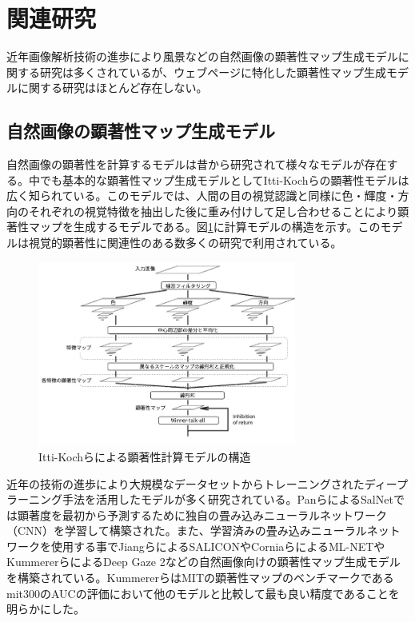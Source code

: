 \newpage
\renewcommand{\baselinestretch}{1.5}
\section{関連研究}
\renewcommand{\baselinestretch}{1}
\par 近年画像解析技術の進歩により風景などの自然画像の顕著性マップ生成モデルに関する研究は多くされているが、ウェブページに特化した顕著性マップ生成モデルに関する研究はほとんど存在しない。

\subsection{自然画像の顕著性マップ生成モデル}\label{subsec:related-01}
\par 自然画像の顕著性を計算するモデルは昔から研究されて様々なモデルが存在する。中でも基本的な顕著性マップ生成モデルとしてItti-Kochらの顕著性モデル\cite{itti1998model}は広く知られている。このモデルでは、人間の目の視覚認識と同様に色・輝度・方向のそれぞれの視覚特徴を抽出した後に重み付けして足し合わせることにより顕著性マップを生成するモデルである。図\ref{fig_itti-kochi}に計算モデルの構造を示す。このモデルは視覚的顕著性に関連性のある数多くの研究で利用されている。

\begin{figure}[H]
    \centering
    \includegraphics[width=8.5cm]{figures/itti-kochi-model.jpg}
    \caption{Itti-Kochらによる顕著性計算モデルの構造\cite{itti1998model}\label{subsec:related-01}}
    \label{fig_itti-kochi}
\end{figure}

\par 近年の技術の進歩により大規模なデータセットからトレーニングされたディープラーニング手法を活用したモデルが多く研究されている。PanらによるSalNet\cite{pan2016shallow}では顕著度を最初から予測するために独自の畳み込みニューラルネットワーク（CNN）を学習して構築された。また、学習済みの畳み込みニューラルネットワークを使用する事でJiangらによるSALICON\cite{jiang2015salicon}やCorniaらによるML-NET\cite{Cornia_2018}やKummererらによるDeep Gaze 2\cite{kummerer2016deepgaze}などの自然画像向けの顕著性マップ生成モデルを構築されている。KummererらはMITの顕著性マップのベンチマークであるmit300\cite{mit-saliency-benchmark}のAUCの評価において他のモデルと比較して最も良い精度であることを明らかにした。

